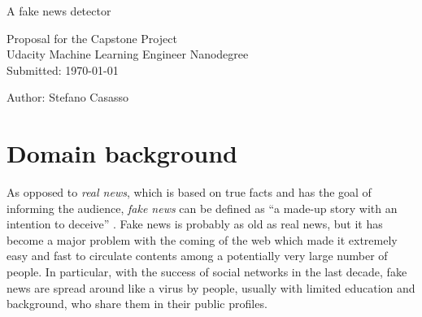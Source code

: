 \documentclass[a4paper,12pt]{article} %
\begin{document}

\begin{titlepage}

\vspace*{\fill} %

\begin{center}

{\LARGE A fake news detector}
\vspace{1.5cm}

{\large Proposal for the Capstone Project\\ Udacity Machine
  Learning Engineer Nanodegree}\\ [1.5cm]

Submitted: \today

\end{center}

Author: Stefano Casasso\\

\vspace*{\fill} %

\end{titlepage}


\section{Domain background}
As opposed to \textit{real news}, which is based on true facts 
and has the goal of informing the audience, 
\textit{fake news} can be defined as ``a made-up story with an
intention to deceive'' \cite{NYT}. 
Fake news is probably as old
as real news, but it has become a major problem with the coming of the
web which made it extremely easy and fast to circulate contents 
among a potentially very large number of people. In particular, with
the success of social networks in the last decade, fake news are
spread around like a virus by people, usually with limited education and
background, who share them in their public profiles. 
  

\end{document}
